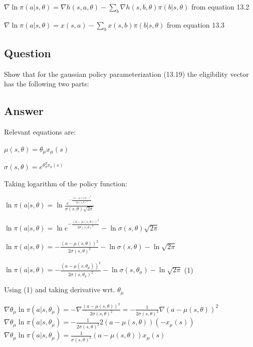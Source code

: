 \documentclass[11pt]{article}
\begin{document}
    \noindent $ \nabla \ln \pi(a|s,\theta) =  \nabla h(s,a,\theta)  -  \sum_{b} \nabla h(s,b,\theta) \pi(b|s,\theta)  $ from equation 13.2

    \noindent $ \nabla \ln \pi(a|s,\theta) =  x(s,a)  -  \sum_{b} x(s,b) \pi(b|s,\theta)  $ from equation 13.3


    \subsection{Question}

    Show that for the gaussian policy parameterization (13.19) the eligibility vector has the following two parts:

    \subsection*{Answer}

    \noindent Relevant equations are:

    \noindent $ \mu(s,\theta) = \theta_\mu x_\mu(s) $

    \noindent $ \sigma(s,\theta) = e^{\theta_{\sigma}^T x_\sigma(s)} $

    \hfill \break
    \noindent Taking logarithm of the policy function:

    \noindent $ \ln \pi(a|s,\theta) = \ln \frac{e^{- \frac{(a-\mu(s,\theta))^2}{2\sigma(s, \theta)^2}}}{\sigma(s,\theta)\sqrt{2\pi}}$

    \noindent $ \ln \pi(a|s,\theta) = \ln e^{- \frac{(a-\mu(s,\theta))^2}{2\sigma(s, \theta)^2}} -  \ln \sigma(s,\theta)\sqrt{2\pi}$

    \noindent $ \ln \pi(a|s,\theta) = - \frac{(a-\mu(s,\theta))^2}{2\sigma(s, \theta)^2} -  \ln \sigma(s,\theta) -  \ln \sqrt{2\pi}$

    \noindent $ \ln \pi(a|s,\theta) = - \frac{(a-\mu(s,\theta_\mu))^2}{2\sigma(s, \theta_\sigma)^2} -  \ln \sigma(s,\theta_\sigma) -  \ln \sqrt{2\pi}$  \hfill (1)

    \hfill \break
    \noindent Using (1) and taking derivative wrt. $ \theta_{\mu} $

    \noindent $ \nabla \theta_\mu \ln \pi(a|s,\theta_\mu) = - \nabla \frac{(a-\mu(s,\theta))^2}{2\sigma(s, \theta)^2} = -\frac{1}{{2\sigma(s, \theta)^2}} \nabla (a-\mu(s,\theta))^2$
    \noindent $ \nabla \theta_\mu \ln \pi(a|s,\theta_\mu) = -\frac{1}{{2\sigma(s, \theta)^2}} 2 (a-\mu(s,\theta)) (-x_\mu(s))$
    \noindent $ \nabla \theta_\mu \ln \pi(a|s,\theta_\mu) = \frac{1}{{\sigma(s, \theta)^2}} (a-\mu(s,\theta)) x_\mu(s)$
\end{document}
